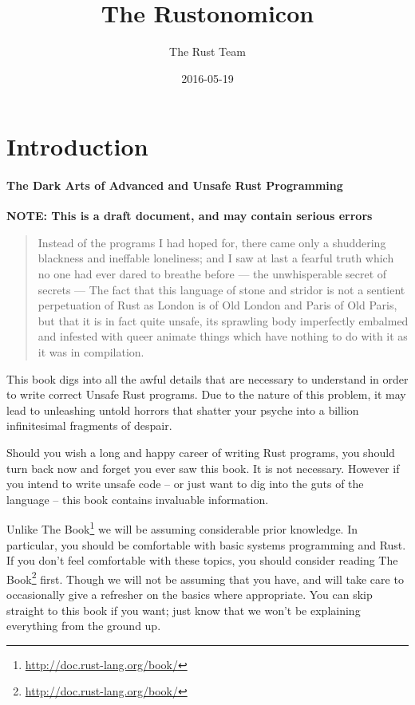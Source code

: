 \documentclass[a4paper,]{book}
\title{The Rustonomicon}
\author{The Rust Team}
\date{2016-05-19}
\renewcommand{\href}[2]{#2\footnote{\url{#1}}}
\begin{document}
  \maketitle



{
  \hypersetup{linkcolor=black}
  \setcounter{tocdepth}{2}
  \tableofcontents
  \newpage
}

\chapter{Introduction}\label{introduction}

\subsubsection{The Dark Arts of Advanced and Unsafe Rust
Programming}\label{the-dark-arts-of-advanced-and-unsafe-rust-programming}

\textbf{NOTE: This is a draft document, and may contain serious errors}

\begin{quote}
Instead of the programs I had hoped for, there came only a shuddering
blackness and ineffable loneliness; and I saw at last a fearful truth
which no one had ever dared to breathe before --- the unwhisperable
secret of secrets --- The fact that this language of stone and stridor
is not a sentient perpetuation of Rust as London is of Old London and
Paris of Old Paris, but that it is in fact quite unsafe, its sprawling
body imperfectly embalmed and infested with queer animate things which
have nothing to do with it as it was in compilation.
\end{quote}

This book digs into all the awful details that are necessary to
understand in order to write correct Unsafe Rust programs. Due to the
nature of this problem, it may lead to unleashing untold horrors that
shatter your psyche into a billion infinitesimal fragments of despair.

Should you wish a long and happy career of writing Rust programs, you
should turn back now and forget you ever saw this book. It is not
necessary. However if you intend to write unsafe code -- or just want to
dig into the guts of the language -- this book contains invaluable
information.

Unlike \href{http://doc.rust-lang.org/book/}{The Book} we will be
assuming considerable prior knowledge. In particular, you should be
comfortable with basic systems programming and Rust. If you don't feel
comfortable with these topics, you should consider
\href{http://doc.rust-lang.org/book/}{reading The Book} first. Though we
will not be assuming that you have, and will take care to occasionally
give a refresher on the basics where appropriate. You can skip straight
to this book if you want; just know that we won't be explaining
everything from the ground up.
\end{document}

